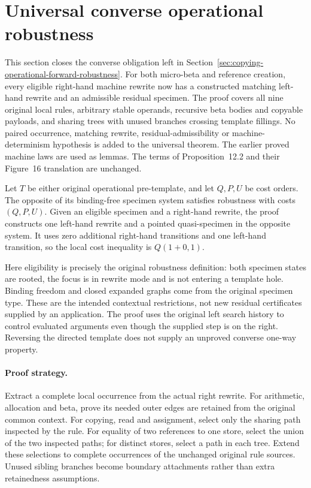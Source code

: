 \clearpage
\section{Universal converse operational robustness}
\label{sec:copying-operational-converse-robustness}
This section closes the converse obligation left in
Section~\ref{sec:copying-operational-forward-robustness}. For both micro-beta
and reference creation, every eligible right-hand machine rewrite now has a
constructed matching left-hand rewrite and an admissible residual specimen.
The proof covers all nine original local rules, arbitrary stable operands,
recursive beta bodies and copyable payloads, and sharing trees with unused
branches crossing template fillings. No paired occurrence, matching rewrite,
residual-admissibility or machine-determinism hypothesis is added to the
universal theorem. The earlier proved machine laws are used as lemmas.
The terms of Proposition~12.2 and their Figure~16 translation are unchanged.

\begin{theorem}
Let $T$ be either original operational pre-template, and let $Q,P,U$ be cost
orders. The opposite of its binding-free specimen system satisfies robustness
with costs $(Q,P,U)$. Given an eligible specimen and a right-hand rewrite,
the proof constructs one left-hand rewrite and a pointed quasi-specimen in
the opposite system. It uses zero additional right-hand transitions and one
left-hand transition, so the local cost inequality is $Q(1+0,1)$.
\end{theorem}
Here eligibility is precisely the original robustness definition: both
specimen states are rooted, the focus is in rewrite mode and is not entering
a template hole. Binding freedom and closed expanded graphs come from the
original specimen type. These are the intended contextual restrictions,
not new residual certificates supplied by an application. The proof uses
the original left search history to control evaluated arguments even though
the supplied step is on the right. Reversing the directed template does not
supply an unproved converse one-way property.

\paragraph{Proof strategy.}
Extract a complete local occurrence from the actual right rewrite. For
arithmetic, allocation and beta, prove its needed outer edges are retained
from the original common context. For copying, read and assignment, select
only the sharing path inspected by the rule. For equality of two references
to one store, select the union of the two inspected paths; for distinct
stores, select a path in each tree. Extend these selections to complete
occurrences of the unchanged original rule sources. Unused sibling branches
become boundary attachments rather than extra retainedness assumptions.


